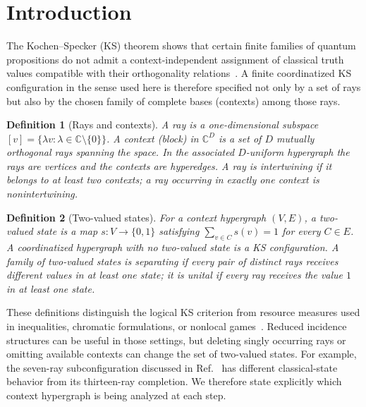 \documentclass[%
  reprint,
  superscriptaddress,
  showpacs,
  showkeys,
  amsmath,amssymb,
  pra,
  longbibliography,
  floatfix,
  x11names
]{revtex4-2}
\newenvironment{revision}{\begingroup\color{revisionblue}}{\endgroup}
\newtheorem{definition}{Definition}
\begin{document}
\section{Introduction}

\begin{revision}
The Kochen--Specker (KS) theorem shows that certain finite families of quantum propositions do not admit a context-independent assignment of classical truth values compatible with their orthogonality relations~\cite{kochen1}.  A finite coordinatized KS configuration in the sense used here is therefore specified not only by a set of rays but also by the chosen family of complete bases (contexts) among those rays.

\begin{definition}[Rays and contexts]
\label{def:contexts}
A \emph{ray} is a one-dimensional subspace $[v]=\{\lambda v:\lambda\in\mathbb{C}\setminus\{0\}\}$.  A \emph{context} (block) in $\mathbb{C}^D$ is a set of $D$ mutually orthogonal rays spanning the space.  In the associated $D$-uniform hypergraph the rays are vertices and the contexts are hyperedges.  A ray is \emph{intertwining} if it belongs to at least two contexts; a ray occurring in exactly one context is nonintertwining.
\end{definition}

\begin{definition}[Two-valued states]
\label{def:states}
For a context hypergraph $(V,E)$, a two-valued state is a map $s:V\to\{0,1\}$ satisfying $\sum_{v\in C}s(v)=1$ for every $C\in E$.  A coordinatized hypergraph with no two-valued state is a KS configuration.  A family of two-valued states is \emph{separating} if every pair of distinct rays receives different values in at least one state; it is \emph{unital} if every ray receives the value $1$ in at least one state.
\end{definition}

These definitions distinguish the logical KS criterion from resource measures used in inequalities, chromatic formulations, or nonlocal games~\cite{cabello:210401,2024-cabello-trandafir0,svozil-2025-color}.  Reduced incidence structures can be useful in those settings, but deleting singly occurring rays or omitting available contexts can change the set of two-valued states.  For example, the seven-ray subconfiguration discussed in Ref.~\cite[Fig.~6(a)]{pavicic-2025} has different classical-state behavior from its thirteen-ray completion.  We therefore state explicitly which context hypergraph is being analyzed at each step.


\end{revision}
\end{document}
